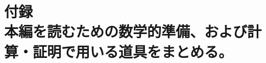 \documentclass[uplatex, dvipdfmx, book, 11pt]{jsbook}
\numberwithin{equation}{section}
\begin{document}
\appendix
\part[付録]{付録\\[2em]
\normalsize\normalfont 本編を読むための数学的準備、および計算・証明で用いる道具をまとめる。}











\backmatter

\nocite{bouchardlecturescomplexgeometry2007, greenestringtheorycalabiyau1997}

\end{document}
